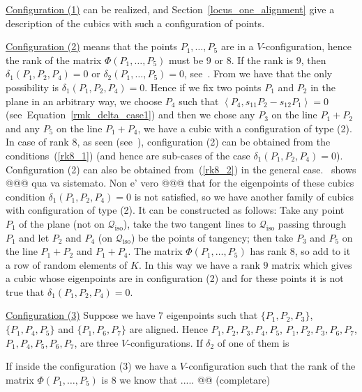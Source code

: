 \documentclass{amsart}
\theoremstyle{plain}
\theoremstyle{definition}
\newcommand{\iso}{\mathcal{Q}_{\mathrm{iso}}}
\newcommand{\scl}[2]{\left\langle {#1}, {#2} \right\rangle}
\begin{document}
\underline{Configuration (1)} can be realized,
 and Section~\ref{locus_one_alignment}
give a description of the cubics with such a configuration of points.

\underline{Configuration (2)} means that the points $P_1, \dots, P_5$ are in a
$V$-configuration, hence the rank of the matrix $\Phi(P_1, \dots, P_5)$
must be $9$ or $8$. If the rank is $9$, then $\delta_1(P_1, P_2, P_4) = 0$
or $\delta_2(P_1, \dots, P_5) = 0$, see~.
From  we have that the only possibility
is $\delta_1(P_1, P_2, P_4) = 0$. Hence if we fix two points $P_1$ and $P_2$
in the plane in an arbitrary way, we choose $P_4$ such that
$\scl{P_4}{s_{11}P_2-s_{12}P_1}=0$
(see~Equation~\eqref{rmk_delta_case1}) and then we chose any $P_3$
on the line $P_1+P_2$ and any $P_5$ on the line $P_1+P_4$, we have a cubic
with a configuration of type (2). In case of rank $8$, as seen
(see~),
configuration (2) can be
obtained from the conditions~(\ref{rk8_1}) (and hence are sub-cases
of the case $\delta_1(P_1, P_2, P_4)=0$). Configuration (2) can also be
obtained from~(\ref{rk8_2}) in the general case.~
shows @@@ qua va sistemato. Non e' vero @@@
that for the eigenpoints of these cubics condition
$\delta_1(P_1,P_2, P_4) = 0$ is not satisfied, so we have another family
of cubics with configuration of type (2). It can be constructed as
follows: Take any point $P_1$ of the plane (not on $\iso$), take the two
tangent lines to $\iso$ passing through $P_1$ and let $P_2$ and $P_4$ (on
$\iso$) be the points of tangency; then take $P_3$ and $P_5$ on the line
$P_1+P_2$ and $P_1+P_4$. The matrix $\Phi(P_1, \dots, P_5)$ has rank $8$, so
add to it a row of random elements of $K$. In this way we have a rank $9$
matrix which gives a cubic whose eigenpoints are in configuration (2) and
for these points it is not true that $\delta_1(P_1, P_2, P_4) = 0$.

\underline{Configuration (3)} Suppose we have $7$ eigenpoints such that
$\{P_1, P_2, P_3\}$, $\{P_1, P_4, P_5\}$ and $\{P_1, P_6, P_7\}$ are
aligned. Hence
$P_1, P_2, P_3, P_4, P_5$, $P_1, P_2, P_3, P_6, P_7$,
$P_1, P_4, P_5, P_6, P_7$, are three $V$-configurations. If
$\delta_2$ of one of them is 




If inside the configuration (3) we
have a $V$-configuration
such that the rank of the matrix $\Phi(P_1, \dots, P_5)$ is $8$
we know that ..... @@ (completare)
\end{document}
